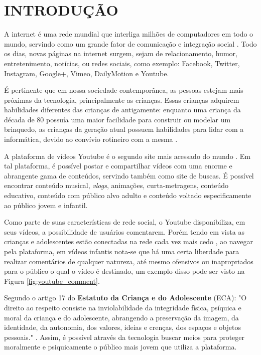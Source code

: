 \section{INTRODUÇÃO}


A internet é uma rede mundial que interliga milhões de computadores em todo o mundo, servindo como um grande fator de comunicação e integração social \cite{marioFalcao2015}. Todo os dias, novas páginas na internet surgem, sejam de relacionamento, humor, entretenimento, notícias, ou redes sociais, como exemplo: Facebook, Twitter, Instagram, Google+, Vimeo, DailyMotion e Youtube.

É pertinente que em nossa sociedade contemporânea, as pessoas estejam mais próximas da tecnologia, principalmente as crianças. 
Essas crianças adquirem habilidades diferentes das crianças de antigamente: enquanto uma criança da década de 80 possuía uma maior facilidade para construir ou modelar um brinquedo, as crianças da geração atual possuem habilidades para lidar com a informática, devido ao convívio rotineiro com a mesma \cite{marioFalcao2016}.

A plataforma de vídeos Youtube é o segundo site mais acessado do mundo \cite{alexaYoutube}. Em tal plataforma, é possível postar e compartilhar vídeos com uma enorme e abrangente gama de conteúdos, servindo também como site de buscas. É possível encontrar conteúdo musical, \textit{vlogs}, animações, curta-metragens, conteúdo educativo, conteúdo com público alvo adulto e conteúdo voltado especificamente ao público jovem e infantil. 

Como parte de suas características de rede social, o Youtube disponibiliza, em seus vídeos, a possibilidade de usuários comentarem. Porém tendo em vista as crianças e adolescentes estão conectadas na rede cada vez mais cedo \cite{EnyoGoncalves2017}, ao navegar pela plataforma, em vídeos infantis nota-se que há uma certa liberdade para realizar comentários de qualquer natureza, até mesmo ofensivos ou inapropriados para o público o qual o vídeo é destinado, um exemplo disso pode ser visto na Figura \ref{fig:youtube_comment}.

Segundo o artigo 17 do \textbf{Estatuto da Criança e do Adolescente} (ECA): "O direito ao respeito consiste na inviolabilidade da integridade física, psíquica e moral da criança e do adolescente, abrangendo a preservação da imagem, da identidade, da autonomia, dos valores, ideias e crenças, dos espaços e objetos pessoais." \cite{eca_lei}.  Assim, é possível através da tecnologia buscar meios para proteger moralmente e psiquicamente o público mais jovem que utiliza a plataforma. %

